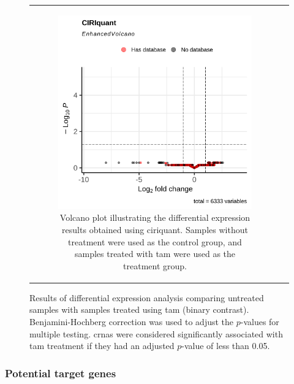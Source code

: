 \begin{figure}[H]
\begin{tabular}{cc}
\begin{subfigure}{0.5\textwidth}
            \includegraphics[width=\linewidth]{chapters/4_results_and_discussion/figures/dea/ciriquant/tamoxifen/volcano.png}
            \caption{Volcano plot illustrating the differential expression
                results obtained using \gls{ciriquant}.
                Samples without treatment were used as the control group, and samples treated
                with \gls{tam} were used as the treatment group.
            }
            \label{fig:tamoxifen_volcano_ciriquant}
        \end{subfigure}

    \end{tabular}
    \caption{Results of differential expression analysis comparing untreated
        samples with samples treated using \gls{tam} (binary contrast).
        Benjamini-Hochberg correction\supercite{benjamini_controlling_1995} was used to
        adjust the $p$-values for multiple testing.
        \Glspl{crna} were considered significantly associated with \gls{tam}
        treatment if they had an adjusted $p$-value of less than 0.05.
    } \label{fig:tamoxifen_volcano} \end{figure}

\subsubsection{Potential target genes}

